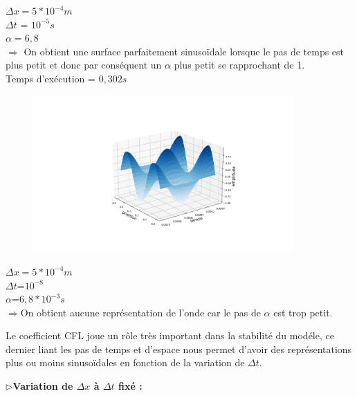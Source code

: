 \begin{enumerate}[label=\alph*)]
\begin{minipage}{.5\textwidth}%
\item $\Delta x = 5*{10}^{-4}m$\\
$\Delta t$ = ${10}^{-5} s $ \\
$\alpha =6,8$\\

$\Longrightarrow$ On obtient une surface parfaitement  sinusoïdale lorsque le pas de temps est plus petit et donc par conséquent un $\alpha$ plus petit se rapprochant de 1.\\ 
Temps d'exécution = $0,302s$
\end{minipage}%
\hfill
\begin{minipage}{.45\textwidth}%
\includegraphics[width=12cm,height=6cm]{implicited.png}
\end{minipage}%




\begin{minipage}{.8\textwidth}%

\item $\Delta x=5*{10}^{-4}m$\\
$\Delta t$=${10}^{-8}$\\
$\alpha$=$6,8*{10}^{-3}s$\\


$\Longrightarrow$On obtient aucune représentation de l'onde car le pas de $\alpha$ est trop petit.\\

\end{minipage}%

Le coefficient CFL joue un rôle très important dans la stabilité du modéle, ce dernier liant les pas de temps et d'espace nous permet d'avoir des représentations plus ou moins sinusoïdales en fonction de la variation de $\Delta t$.
\end{enumerate}

$\triangleright$\textbf{Variation de  $\Delta x$ à $\Delta t$ fixé :}\\

